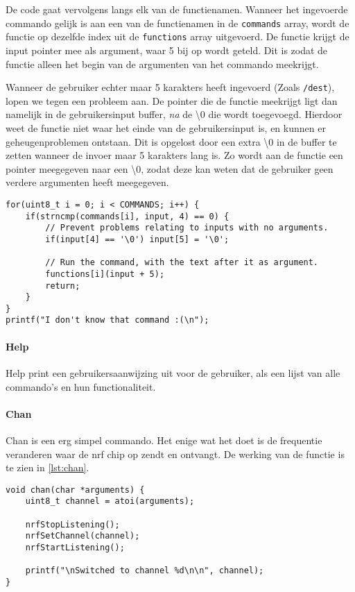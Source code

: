 De code gaat vervolgens langs elk van de functienamen. Wanneer het ingevoerde commando gelijk is aan een van de functienamen in de \texttt{commands} array, wordt de functie op dezelfde index uit de \texttt{functions} array uitgevoerd. De functie krijgt de input pointer mee als argument, waar 5 bij op wordt geteld. Dit is zodat de functie alleen het begin van de argumenten van het commando meekrijgt.

Wanneer de gebruiker echter maar 5 karakters heeft ingevoerd (Zoals \texttt{/dest}), lopen we tegen een probleem aan. De pointer die de functie meekrijgt ligt dan namelijk in de gebruikersinput buffer, \textit{na} de \textbackslash0 die wordt toegevoegd. Hierdoor weet de functie niet waar het einde van de gebruikersinput is, en kunnen er geheugenproblemen ontstaan. Dit is opgelost door een extra \textbackslash0 in de buffer te zetten wanneer de invoer maar 5 karakters lang is. Zo wordt aan de functie een pointer meegegeven naar een \textbackslash0, zodat deze kan weten dat de gebruiker geen verdere argumenten heeft meegegeven.

\begin{lstlisting}[caption={De code die het ingevoerde commando als functie uitvoert},captionpos=b,label={lst:interpretInputRun},style=c,xleftmargin=.\textwidth,xrightmargin=.\textwidth]
for(uint8_t i = 0; i < COMMANDS; i++) {
    if(strncmp(commands[i], input, 4) == 0) {
        // Prevent problems relating to inputs with no arguments.
        if(input[4] == '\0') input[5] = '\0';

        // Run the command, with the text after it as argument.
        functions[i](input + 5);
        return;
    }
}
printf("I don't know that command :(\n");
\end{lstlisting}



\paragraph{Help}
Help print een gebruikersaanwijzing uit voor de gebruiker, als een lijst van alle commando's en hun functionaliteit.

\paragraph{Chan}
Chan is een erg simpel commando. Het enige wat het doet is de frequentie veranderen waar de nrf chip op zendt en ontvangt. De werking van de functie is te zien in \autoref{lst:chan}.
\begin{lstlisting}[caption={De chan functie},captionpos=b,label={lst:chan},style=c,xleftmargin=.\textwidth,xrightmargin=.\textwidth]
void chan(char *arguments) {
    uint8_t channel = atoi(arguments);

    nrfStopListening();
    nrfSetChannel(channel);
    nrfStartListening();

    printf("\nSwitched to channel %d\n\n", channel);
}
\end{lstlisting}

